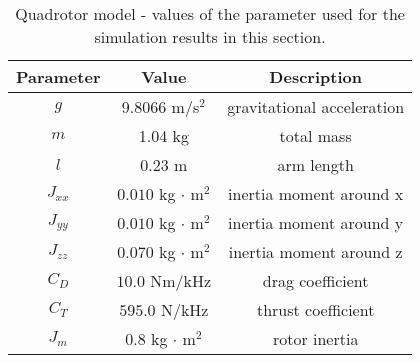 \begin{table}[h]
\caption{Quadrotor model - values of the parameter used for the simulation results in this section.}\label{tab:prm}
\begin{tabular}{ccc}
\hline
\textbf{Parameter} & \textbf{Value}                                  & \textbf{Description}                               \\ \hline
$g$       & 9.8066 m/s$^2$                         & gravitational acceleration                \\ \hline
$m$       & 1.04 kg                                & total mass                                \\ \hline
$l$       & 0.23 m                               & arm length    \\ \hline
$J_{xx}$    & $0.010$ kg $\cdot$ m$^2$ & inertia moment around x \\ \hline
$J_{yy}$    & $0.010$ kg $\cdot$ m$^2$ & inertia moment around y \\ \hline
$J_{zz}$    & $0.070$ kg $\cdot$ m$^2$ & inertia moment around z \\ \hline
$C_D$     & $10.0$ Nm/kHz     & drag coefficient                          \\ \hline
$C_T$     & $595.0$ N/kHz        & thrust coefficient                        \\ \hline
$J_m$	  & $0.8$ kg $\cdot$ m$^2$ & rotor inertia \\ \hline
\end{tabular}
\end{table}